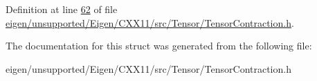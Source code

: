 Definition at line \hyperlink{eigen_2unsupported_2_eigen_2_c_x_x11_2src_2_tensor_2_tensor_contraction_8h_source_l00062}{62} of file \hyperlink{eigen_2unsupported_2_eigen_2_c_x_x11_2src_2_tensor_2_tensor_contraction_8h_source}{eigen/unsupported/\+Eigen/\+C\+X\+X11/src/\+Tensor/\+Tensor\+Contraction.\+h}.



The documentation for this struct was generated from the following file\+:\begin{DoxyCompactItemize}
\item 
eigen/unsupported/\+Eigen/\+C\+X\+X11/src/\+Tensor/\+Tensor\+Contraction.\+h\end{DoxyCompactItemize}
